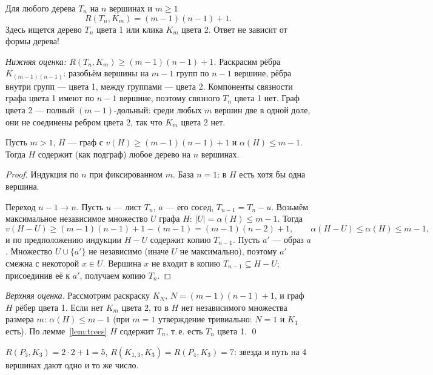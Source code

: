 \begin{theorem}[Хватал, 1977]
Для любого дерева \(T_n\) на \(n\) вершинах и \(m\ge1\)
\[
R(T_n,K_m)=(m-1)(n-1)+1 .
\]
Здесь ищется дерево \(T_n\) цвета 1 или клика \(K_m\) цвета 2. Ответ не зависит от формы дерева!
\end{theorem}
\textit{Нижняя оценка: \(R(T_n,K_m)\ge(m-1)(n-1)+1\).}
Раскрасим рёбра \(K_{(m-1)(n-1)}\): разобьём вершины на \(m-1\) групп по \(n-1\) вершине,
рёбра внутри групп — цвета 1, между группами — цвета 2. Компоненты связности
графа цвета 1 имеют по \(n-1\) вершине, поэтому связного \(T_n\) цвета 1 нет. Граф
цвета 2 — полный \((m-1)\)-дольный: среди любых \(m\) вершин две в одной доле, они не
соединены ребром цвета 2, так что \(K_m\) цвета 2 нет.


\begin{lemma}\label{lem:trees}
Пусть \(m>1\), \(H\) — граф с \(v(H)\ge(m-1)(n-1)+1\) и \(\alpha(H)\le m-1\). Тогда \(H\)
содержит (как подграф) любое дерево на \(n\) вершинах.
\end{lemma}
\begin{proof}
Индукция по \(n\) при фиксированном \(m\). База \(n=1\): в \(H\) есть хотя бы одна вершина.

Переход \(n-1\to n\). Пусть \(u\) — лист \(T_n\), \(a\) — его сосед, \(T_{n-1}=T_n-u\).
Возьмём максимальное независимое множество \(U\) графа \(H\): \(|U|=\alpha(H)\le m-1\). Тогда
\[
v(H-U)\ge(m-1)(n-1)+1-(m-1)=(m-1)(n-2)+1,\qquad \alpha(H-U)\le\alpha(H)\le m-1,
\]
и по предположению индукции \(H-U\) содержит копию \(T_{n-1}\). Пусть \(a'\) — образ \(a\).
Множество \(U\cup\{a'\}\) не независимо (иначе \(U\) не максимально), поэтому \(a'\) смежна
с некоторой \(x\in U\). Вершина \(x\) не входит в копию \(T_{n-1}\subseteq H-U\);
присоединив её к \(a'\), получаем копию \(T_n\).
\end{proof}


\textit{Верхняя оценка.} Рассмотрим раскраску \(K_N\), \(N=(m-1)(n-1)+1\), и граф \(H\)
рёбер цвета 1. Если нет \(K_m\) цвета 2, то в \(H\) нет независимого множества размера
\(m\): \(\alpha(H)\le m-1\) (при \(m=1\) утверждение тривиально: \(N=1\) и \(K_1\) есть). По
лемме~\ref{lem:trees} \(H\) содержит \(T_n\), т.\,е. есть \(T_n\) цвета 1. \qed

\begin{example}
\(R(P_3,K_3)=2\cdot2+1=5\), \(R(K_{1,3},K_3)=R(P_4,K_3)=7\): звезда и путь на 4 вершинах
дают одно и то же число.
\end{example}
